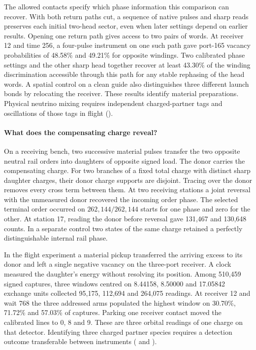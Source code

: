 \documentclass[11pt]{article}
\begin{document}
The allowed contacts specify which phase information this comparison
can recover. With both return paths cut, a sequence of native pulses
and sharp reads preserves each initial two-head sector, even when later
settings depend on earlier results. Opening one return path gives
access to two pairs of words. At receiver 12 and time 256, a four-pulse
instrument on one such path gave port-165 vacancy probabilities of
48.58\% and 49.21\% for opposite windings. Two calibrated
phase settings and the other sharp head together recover at least
43.30\% of the winding discrimination accessible through this
path for any stable rephasing of the head words. A spatial control on
a clean guide also distinguishes three different launch bonds by
relocating the receiver. These results identify material preparations.
Physical neutrino mixing requires independent charged-partner tags and
oscillations of those tags in flight
().

\paragraph{What does the compensating charge reveal?}
On a receiving bench, two successive material pulses transfer the two
opposite neutral rail orders into daughters of opposite signed load.
The donor carries the compensating charge. For two branches of a fixed
total charge with distinct sharp daughter charges, their donor charge
supports are disjoint. Tracing over the donor removes every
cross term between them. At two receiving stations a joint reversal
with the unmeasured donor recovered the incoming order phase.
The selected terminal order occurred on $262{,}144/262{,}144$ starts
for one phase and zero for the other. At station 17, reading the donor
before reversal gave 131,467 and 130,648 counts. In a separate control
two states of the same charge retained a perfectly distinguishable
internal rail phase.

In the flight experiment a material pickup transferred the arriving
excess to its donor and left a single negative vacancy on the
three-port receiver. A clock measured the daughter's energy without
resolving its position. Among 510,459 signed captures, three windows
centred on 8.44158, 8.50000 and 17.05842 exchange units collected
95,175, 112,694 and 264,075 readings. At receiver 12 and wait 768 the
three addressed arms populated the highest window on 30.70\%, 71.72\%
and 57.03\% of captures. Parking one receiver contact moved the
calibrated lines to 0, 8 and 9. These are three orbital readings of
one charge on that detector. Identifying three charged partner species
requires a detection outcome transferable between instruments
( and
).
\end{document}
